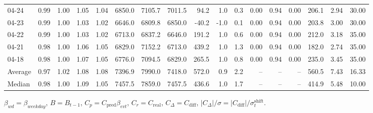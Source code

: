 \begin{threeparttable}
{\begin{tabular}{lrrrrrrrrrrrrrrrr}
  04-24 &         0.99 &           1.00 &          1.05 &          1.04 & 6850.0 & 7105.7 & 7011.5 &       94.2 &                      1.0 &                 0.3 &       0.00 &      0.94 &           0.00 &            206.1 &            2.94 &                  30.00 \\
  04-23 &         0.99 &           1.00 &          1.03 &          1.02 & 6646.0 & 6809.8 & 6850.0 &      -40.2 &                     -1.0 &                 0.1 &       0.00 &      0.94 &           0.00 &            203.8 &            3.00 &                  30.00 \\
  04-22 &         0.99 &           1.00 &          1.03 &          1.02 & 6713.0 & 6837.2 & 6646.0 &      191.2 &                      1.0 &                 0.6 &       0.00 &      0.94 &           0.00 &            212.0 &            3.18 &                  35.00 \\
  04-21 &         0.98 &           1.00 &          1.06 &          1.05 & 6829.0 & 7152.2 & 6713.0 &      439.2 &                      1.0 &                 1.3 &       0.00 &      0.94 &           0.00 &            182.0 &            2.74 &                  35.00 \\
  04-18 &         0.98 &           1.00 &          1.07 &          1.05 & 6776.0 & 7094.5 & 6829.0 &      265.5 &                      1.0 &                 0.8 &       0.00 &      0.94 &           0.00 &            235.0 &            3.45 &                  35.00 \\
Average &         0.97 &           1.02 &          1.08 &          1.08 & 7396.9 & 7990.0 & 7418.0 &      572.0 &                      0.9 &                 2.2 &         -- &        -- &             -- &            560.5 &            7.43 &                  16.33 \\
 Median &         0.98 &           1.00 &          1.09 &          1.05 & 7457.5 & 7859.0 & 7457.5 &      436.6 &                      1.0 &                 1.7 &         -- &        -- &             -- &            414.9 &            5.48 &                  10.00 \\
\bottomrule
\end{tabular}
}
\begin{tablenotes}\footnotesize
\item $\beta_{wd}=\beta_{weekday}$, $B=B_{t-1}$,
$C_p=C_{\text{pred}}\beta_{evt}$, $C_r=C_{\text{real}}$,
$C_\Delta=C_{\text{diff}}$, $|C_\Delta|/\sigma=|C_{\text{diff}}|/\sigma_t^{\text{shift}}$.
\end{tablenotes}
\end{threeparttable}
\endgroup

